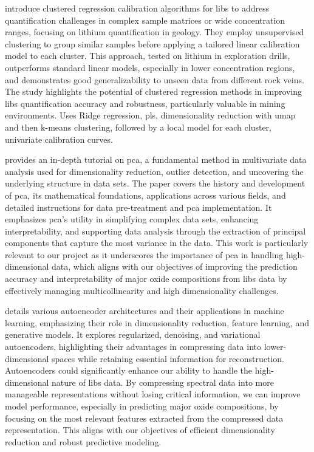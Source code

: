 \citet{silvaRobustCalibrationModels2022} introduce clustered regression calibration algorithms for \gls{libs} to address quantification challenges in complex sample matrices or wide concentration ranges, focusing on lithium quantification in geology.
They employ unsupervised clustering to group similar samples before applying a tailored linear calibration model to each cluster.
This approach, tested on lithium in exploration drills, outperforms standard linear models, especially in lower concentration regions, and demonstrates good generalizability to unseen data from different rock veins.
The study highlights the potential of clustered regression methods in improving \gls{libs} quantification accuracy and robustness, particularly valuable in mining environments.
Uses Ridge regression, \gls{pls}, dimensionality reduction with \gls{umap} and then k-means clustering, followed by a local model for each cluster, univariate calibration curves.

\citet{woldPrincipalComponentAnalysis1987} provides an in-depth tutorial on \gls{pca}, a fundamental method in multivariate data analysis used for dimensionality reduction, outlier detection, and uncovering the underlying structure in data sets.
The paper covers the history and development of \gls{pca}, its mathematical foundations, applications across various fields, and detailed instructions for data pre-treatment and \gls{pca} implementation.
It emphasizes \gls{pca}'s utility in simplifying complex data sets, enhancing interpretability, and supporting data analysis through the extraction of principal components that capture the most variance in the data.
This work is particularly relevant to our project as it underscores the importance of \gls{pca} in handling high-dimensional data, which aligns with our objectives of improving the prediction accuracy and interpretability of major oxide compositions from \gls{libs} data by effectively managing multicollinearity and high dimensionality challenges.

\citet{bankAutoencoders2021} details various autoencoder architectures and their applications in machine learning, emphasizing their role in dimensionality reduction, feature learning, and generative models.
It explores regularized, denoising, and variational autoencoders, highlighting their advantages in compressing data into lower-dimensional spaces while retaining essential information for reconstruction.
Autoencoders could significantly enhance our ability to handle the high-dimensional nature of \gls{libs} data.
By compressing spectral data into more manageable representations without losing critical information, we can improve model performance, especially in predicting major oxide compositions, by focusing on the most relevant features extracted from the compressed data representation.
This aligns with our objectives of efficient dimensionality reduction and robust predictive modeling.
